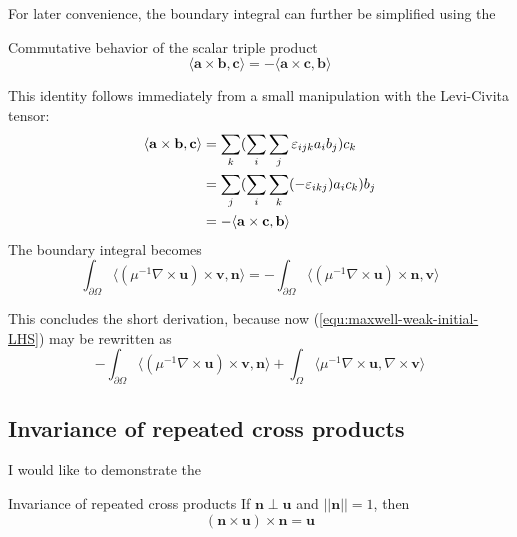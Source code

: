 \documentclass[11pt, a4paper]{article}
\begin{document}
For later convenience, the boundary integral can further be simplified using the
\begin{fancybox}{Commutative behavior of the scalar triple product}
    \begin{equation}
        \langle \mathbf{a} \times \mathbf{b}, \mathbf{c} \rangle = - \langle \mathbf{a} \times \mathbf{c}, \mathbf{b} \rangle \label{equ:vector-algebra}
    \end{equation}
\end{fancybox}
This identity follows immediately from a small manipulation with the Levi-Civita
tensor:
\begin{align}
    \langle \mathbf{a} \times \mathbf{b}, \mathbf{c} \rangle
    &= \sum_k (\sum_i \sum_j \varepsilon_{ijk} a_i b_j) c_k \notag \\
    &= \sum_j (\sum_i \sum_k (-\varepsilon_{ikj}) a_i c_k) b_j \notag \\ 
    &= - \langle \mathbf{a} \times \mathbf{c}, \mathbf{b} \rangle
\end{align}
The boundary integral becomes 
\begin{equation}
    \int_{\partial \Omega} \langle ({\mu^{-1} \nabla \times \mathbf{u}}) \times \mathbf{v}, \mathbf{n} \rangle
    = - \int_{\partial \Omega} \langle ({\mu^{-1} \nabla \times \mathbf{u}}) \times \mathbf{n}, \mathbf{v} \rangle
\end{equation}

This concludes the short derivation, because now (\ref{equ:maxwell-weak-initial-LHS})
may be rewritten as
\begin{equation}
    - \int_{\partial \Omega} \langle ({\mu^{-1} \nabla \times \mathbf{u}}) \times \mathbf{v}, \mathbf{n} \rangle
    + \int_{\Omega} \langle {\mu^{-1} \nabla \times \mathbf{u}},\nabla \times \mathbf{v} \rangle
\end{equation}

\subsection*{Invariance of repeated cross products}
\label{subsec:invariance}

I would like to demonstrate the
\begin{fancybox}{Invariance of repeated cross products}
    If $\mathbf{n} \perp \mathbf{u}$ and $||\mathbf{n}|| = 1$, then
    \begin{equation}
        (\mathbf{n} \times \mathbf{u}) \times \mathbf{n} = \mathbf{u} \label{equ:double-cross-normal}
    \end{equation}
\end{fancybox}
\end{document}
